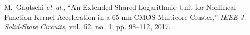 \documentclass[%
 oneside,      %
 openany,      %
 halfparskip,  %
]{scrbook}
\begin{document}
\begin{thebibliography}{100}

M.~Gautschi \emph{et~al.}, ``{An Extended Shared Logarithmic Unit for Nonlinear
  Function Kernel Acceleration in a 65-nm CMOS Multicore Cluster},'' \emph{IEEE
  J. Solid-State Circuits}, vol.~52, no.~1, pp. 98--112, 2017.


\end{thebibliography}
\end{document}
